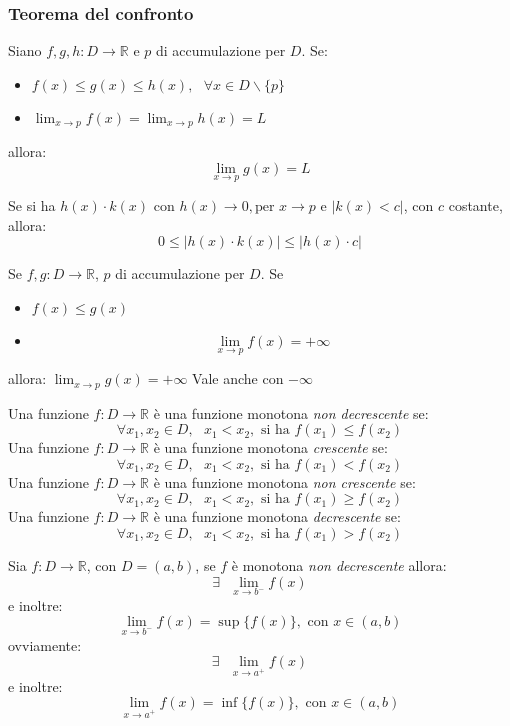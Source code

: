 \documentclass[a4paper,12pt, oneside]{book}
\begin{document}
\subsubsection{Teorema del confronto}
\begin{teorema} Siano $f,g,h:D\rightarrow \mathbb{R}$ e $p$ di
  accumulazione per $D$. Se:
  \begin{itemize}
    \item $f(x)\leq g(x)\leq h(x),\mbox{ } \forall x\in D \backslash \{p\}$
    \item $\lim_{x\rightarrow p} f(x) =\lim_{x\rightarrow p} h(x)=L$
  \end{itemize} allora:
  $$\lim_{x\rightarrow p} g(x)=L$$
\end{teorema}
\begin{osservazione} Se si ha $h(x)\cdot k(x)$ con $h(x)\rightarrow 0, \mbox{
    per } x\rightarrow p$ e $|k(x)<c|$, con $c$ costante, allora:
  $$0\leq |h(x)\cdot k(x)|\leq |h(x)\cdot c|$$
\end{osservazione}
\begin{corollario} Se $f,g:D\rightarrow \mathbb{R}$, $p$ di accumulazione per
  $D$. Se
  \begin{itemize}
    \item $f(x)\leq g(x)$
    \item $$\lim_{x\rightarrow p} f(x) = +\infty$$
  \end{itemize} allora: $\lim_{x\rightarrow p} g(x) =+\infty$ Vale anche con
  $-\infty$
\end{corollario}
\begin{nota}
  \begin{shaded} Una funzione $f:D\rightarrow \mathbb{R}$ è una funzione
    monotona \textit{non decrescente} se:
    $$\forall x_1,x_2\in D, \mbox{ } x_1<x_2, \mbox{ si ha } f(x_1)\leq f(x_2)$$
    Una funzione $f:D\rightarrow \mathbb{R}$ è una funzione monotona
    \textit{crescente} se:
    $$\forall x_1,x_2\in D, \mbox{ } x_1<x_2, \mbox{ si ha } f(x_1)< f(x_2)$$
    Una funzione $f:D\rightarrow \mathbb{R}$ è una funzione monotona \textit{non
      crescente} se:
    $$\forall x_1,x_2\in D, \mbox{ } x_1<x_2, \mbox{ si ha } f(x_1)\geq f(x_2)$$
    Una funzione $f:D\rightarrow \mathbb{R}$ è una funzione monotona
    \textit{decrescente} se:
    $$\forall x_1,x_2\in D, \mbox{ } x_1<x_2, \mbox{ si ha } f(x_1)> f(x_2)$$
  \end{shaded}
\end{nota}
\begin{teorema} Sia
  $f:D\rightarrow \mathbb{R}$, con $D=(a,b)$, se $f$ è monotona \textit{non
    decrescente} allora:
  $$\exists \mbox{ } \lim_{x\rightarrow b^{-}} f(x)$$
  e inoltre:
  $$ \lim_{x\rightarrow b^{-}} f(x)=\sup\{f(x)\}, \mbox{ con } x\in (a,b)$$
  ovviamente:
  $$\exists \mbox{ } \lim_{x\rightarrow a^{+}} f(x)$$
  e inoltre:
  $$ \lim_{x\rightarrow a^{+}} f(x)=\inf\{f(x)\}, \mbox{ con } x\in (a,b)$$
\end{teorema}
\end{document}
